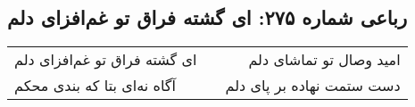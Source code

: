 \begin{center}
\section*{رباعی شماره ۲۷۵: ای گشته فراق تو غم‌افزای دلم}
\label{sec:sh275}
\begin{longtable}{l p{0.5cm} r}
ای گشته فراق تو غم‌افزای دلم
&&
امید وصال تو تماشای دلم
\\
آگاه نه‌ای بتا که بندی محکم
&&
دست ستمت نهاده بر پای دلم
\\
\end{longtable}
\end{center}
